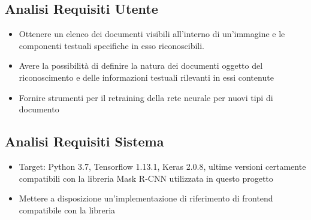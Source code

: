 \documentclass[12pt,A4]{article}
\begin{document}
\subsection{Analisi Requisiti Utente}

\begin{itemize}
    \item Ottenere un elenco dei documenti visibili all'interno di
        un'immagine e le componenti testuali specifiche in esso
        riconoscibili.
    \item Avere la possibilità di definire la natura dei documenti
        oggetto del riconoscimento e delle informazioni testuali
        rilevanti in essi contenute
    \item Fornire strumenti per il retraining della rete neurale per
        nuovi tipi di documento
\end{itemize}

\subsection{Analisi Requisiti Sistema}

\begin{itemize}
    \item Target: Python 3.7, Tensorflow 1.13.1, Keras 2.0.8, ultime
        versioni certamente compatibili con la libreria Mask
        \textsc{R-CNN} utilizzata in questo progetto
    \item Mettere a disposizione un'implementazione di riferimento di
        frontend compatibile con la libreria
\end{itemize}
\end{document}
